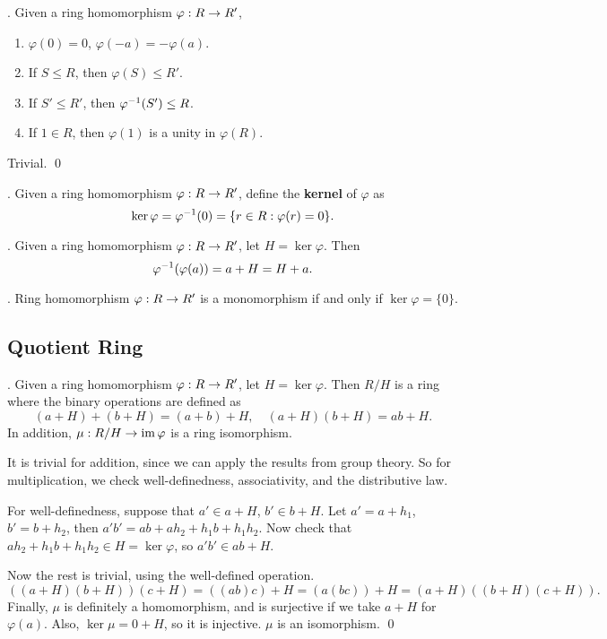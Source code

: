 \thm. Given a ring homomorphism \(\varphi: R \rightarrow R'\),
\begin{enumerate}
    \item \(\varphi(0) = 0\), \(\varphi(-a) = -\varphi(a)\).
    \item If \(S \leq R\), then \(\varphi(S) \leq R'\).
    \item If \(S' \leq R'\), then \(\varphi^{-1}(S') \leq R\).
    \item If \(1 \in R\), then \(\varphi(1)\) is a unity in \(\varphi(R)\).
\end{enumerate}

\pf Trivial. \qed

.  Given a ring homomorphism \(\varphi : R \rightarrow R'\), define the \textbf{kernel} of \(\varphi\) as
\[
    \ker \varphi = \varphi^{-1}(0) = \{r \in R : \varphi(r) = 0\}.
\]

\thm. Given a ring homomorphism \(\varphi : R \rightarrow R'\), let \(H = \ker\varphi\). Then
\[
    \varphi^{-1}(\varphi(a)) = a + H = H + a.
\]

\cor. Ring homomorphism \(\varphi : R \rightarrow R'\) is a monomorphism if and only if \(\ker\varphi = \{0\}\).

\pagebreak

\subsection*{Quotient Ring}

\thm. Given a ring homomorphism \(\varphi : R \rightarrow R'\), let \(H = \ker \varphi\). Then \(R / H\) is a ring where the binary operations are defined as
\[
    (a + H) + (b + H) = (a + b) + H, \quad (a + H)(b + H) = ab + H.
\]
In addition, \(\mu : R/H \rightarrow \operatorname{im} \varphi\) is a ring isomorphism.

\pf It is trivial for addition, since we can apply the results from group theory. So for multiplication, we check well-definedness, associativity, and the distributive law.

For well-definedness, suppose that \(a' \in a + H\), \(b' \in b + H\). Let \(a' = a + h_1\), \(b' = b + h_2\), then \(a'b' = ab + ah_2 + h_1b + h_1h_2\). Now check that \(ah_2 + h_1b + h_1h_2 \in H = \ker\varphi\), so \(a'b' \in ab + H\).

Now the rest is trivial, using the well-defined operation.
\[
    ((a + H)(b + H))(c + H) = ((ab)c) + H = (a(bc)) + H = (a + H)((b + H)(c + H)).
\]
Finally, \(\mu\) is definitely a homomorphism, and is surjective if we take \(a + H\) for \(\varphi(a)\). Also, \(\ker \mu = 0 + H\), so it is injective. \(\mu\) is an isomorphism. \qed

